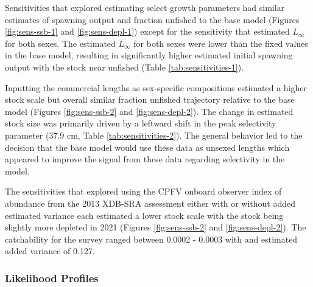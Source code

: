 \documentclass[11pt,
  english,
  a4paper,
]{article}
\begin{document}
\leavevmode\tagmcend\tagstructend\par


Sensitivities that explored estimating select growth parameters had similar estimates of spawning output and fraction unfished to the base model (Figures \ref{fig:sens-ssb-1} and \ref{fig:sens-depl-1}) except for the sensitivity that estimated {\(L_{\infty}\)\leavevmode\tagmcend\tagstructend} for both sexes. The estimated {\(L_{\infty}\)\leavevmode\tagmcend\tagstructend} for both sexes were lower than the fixed values in the base model, resulting in significantly higher estimated initial spawning output with the stock near unfished (Table \ref{tab:sensitivities-1}).

\leavevmode\tagmcend\tagstructend\par


Inputting the commercial lengths as sex-specific compositions estimated a higher stock scale but overall similar fraction unfished trajectory relative to the base model (Figures \ref{fig:sens-ssb-2} and \ref{fig:sens-depl-2}). The change in estimated stock size was primarily driven by a leftward shift in the peak selectivity parameter (37.9 cm, Table \ref{tab:sensitivities-2}). The general behavior led to the decision that the base model would use these data as unsexed lengths which appeared to improve the signal from these data regarding selectivity in the model.

\leavevmode\tagmcend\tagstructend\par


The sensitivities that explored using the CPFV onboard observer index of abundance from the 2013 XDB-SRA assessment either with or without added estimated variance each estimated a lower stock scale with the stock being slightly more depleted in 2021 (Figures \ref{fig:sens-ssb-2} and \ref{fig:sens-depl-2}). The catchability for the survey ranged between 0.0002 - 0.0003 with and estimated added variance of 0.127.

\leavevmode\tagmcend\tagstructend\par


\hypertarget{like-profiles}{%
\subsubsection{Likelihood Profiles}\label{like-profiles}}
\end{document}
